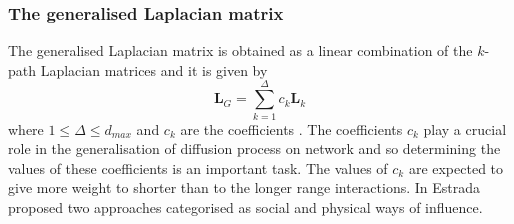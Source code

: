 \documentclass[10pt,a4paper]{article}
\theoremstyle{plain}
\theoremstyle{definition}
\begin{document}
%    	    	
    	    \subsubsection{The generalised Laplacian matrix}
    	    The generalised Laplacian matrix is obtained as a linear combination of the $k$-path Laplacian matrices and it is given by
    	    \begin{equation}
    	    \mathbf{L}_{G} = \sum_{k=1}^{\Delta} c_{k} \mathbf{L}_{k}
    	    \end{equation}
			where $1 \leq \Delta \leq d_{max}$ and $c_k$ are the coefficients \citep{estrada2012path}.
		    The coefficients $c_k$ play a crucial role in the generalisation of diffusion process on network and so determining the values of these coefficients is an important task. The values of $c_k$ are expected to give more weight to shorter than to the longer range interactions. In \citep{estrada2012path} Estrada proposed two approaches categorised as social and physical ways of influence.
		    
\end{document}
